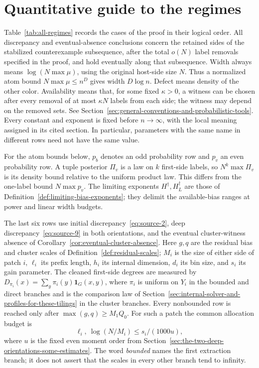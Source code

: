 \section{Quantitative guide to the regimes}
\label{app:regime-table}

Table~\ref{tab:all-regimes} records the cases of the proof in their logical
order. All discrepancy and eventual-absence conclusions concern the
retained sides of the stabilized counterexample subsequence, after the
total $o(N)$ label removals specified in the proof, and hold eventually
along that subsequence. Width always means $\log(N\max\mu)$, using
the original host-side size $N$. Thus a normalized atom bound $N\max\mu\le n^D$ gives width
$D\log n$. Defect means density of the other color. Availability means
that, for some fixed $\kappa>0$, a witness can be chosen after every
removal of at most $\kappa N$ labels from each side; the witness may
depend on the removed sets. See
Section~\ref{sec:general-conventions-and-probabilistic-tools}.
Every constant and exponent is fixed before $n\to\infty$, with the
local meaning assigned in its cited section. In particular, parameters
with the same name in different rows need not have the same value.

For the atom bounds below, $p_b$ denotes an odd probability row and $p_v$
an even probability row. A tuple posterior $\Pi_v$ is a law on $k$
first-side labels, so $N^k\max\Pi_v$ is its density bound relative to
the uniform product law. This differs from the one-label bound
$N\max p_v$. The limiting exponents $H^\dagger,H_L^\dagger$ are those
of Definition~\ref{def:limiting-bias-exponents}; they delimit the
available-bias ranges at power and linear width budgets.

The last six rows use initial discrepancy~\eqref{eq:source-2}, deep
discrepancy~\eqref{eq:source-9} in both orientations, and the eventual
cluster-witness absence of Corollary~\ref{cor:eventual-cluster-absence}.
Here $g,q$ are the residual bias and cluster scales of
Definition~\ref{def:residual-scales}; $M_i$ is the size of either side of
patch $i$, $\ell_i$ its prefix length, $h_i$ its internal dimension,
$d_i$ its bin size, and $s_i$ its gain parameter. The cleaned first-side
degrees are measured by
$D_{\pi_i}(x)=\sum_y\pi_i(y)\mathbf1_G(x,y)$, where $\pi_i$ is
uniform on $Y_i$ in the bounded and direct branches and is the comparison
law of Section~\ref{sec:internal-solver-and-profiles-for-these-tilings}
in the cluster branches. Every nonbounded row is reached only after
$\max(g,q)\ge M_1Q_0$. For such a patch the common allocation budget is
\[
 \ell_i,\ \log(N/M_i)\le s_i/(1000u),
\]
where $u$ is the fixed even moment order from
Section~\ref{sec:the-two-deep-orientations-some-estimates}. The word
\emph{bounded} names the first extraction branch; it does not assert that
the scales in every other branch tend to infinity.

